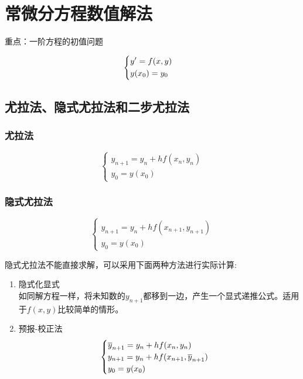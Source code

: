\documentclass[12pt]{report}
\begin{document}
\chapter{常微分方程数值解法}

重点：一阶方程的初值问题

\begin{equation}
	\begin{cases}
		\begin{aligned}
			&y' = f(x,y)\\
			&y(x_0)=y_0
		\end{aligned}
	\end{cases}
	\notag
\end{equation}

\section{尤拉法、隐式尤拉法和二步尤拉法}

\subsection{尤拉法}

\begin{equation} \tag{4.1} \label{4.1}
	\begin{cases}
		y_{n+1} = y_n + hf(x_n , y_n) \\
		y_0 = y(x_0)
	\end{cases}
\end{equation}

\subsection{隐式尤拉法}

\begin{equation} \tag{4.2} \label{4.2}
	\begin{cases}
		y_{n+1} = y_n + hf(x_{n+1} , y_{n+1}) \\
		y_0 = y(x_0)
	\end{cases}
\end{equation}

隐式尤拉法不能直接求解，可以采用下面两种方法进行实际计算:

\begin{enumerate}
	\item 隐式化显式\\
	如同解方程一样，将未知数的$y_{n+1}$都移到一边，产生一个显式递推公式。适用于$f(x,y)$比较简单的情形。
	\item 预报-校正法
	\begin{equation}
		\notag
		\begin{cases}
			\overline{y}_{n+1} = y_n + hf(x_n, y_n) \\
			y_{n+1} = y_n + hf(x_{n+1}, \overline{y}_{n+1}) \\
			y_0 = y(x_0)
		\end{cases}
	\end{equation}
\end{enumerate}
\end{document}
